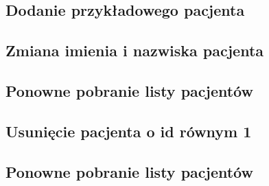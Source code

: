 \documentclass[a4paper, 11pt]{article}
\begin{document}
 \subsection{Dodanie przykładowego pacjenta}
 
 
 \subsection{Zmiana imienia i nazwiska pacjenta}
 

 \subsection{Ponowne pobranie listy pacjentów}
 

 \subsection{Usunięcie pacjenta o id równym 1}
 

 \subsection{Ponowne pobranie listy pacjentów}
 
\end{document}
